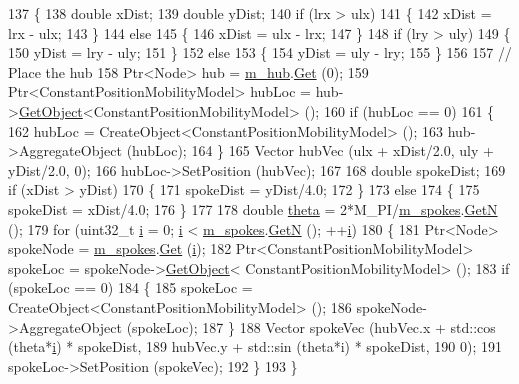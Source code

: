 \begin{DoxyCode}
137 \{
138   \textcolor{keywordtype}{double} xDist;
139   \textcolor{keywordtype}{double} yDist;
140   \textcolor{keywordflow}{if} (lrx > ulx)
141     \{
142       xDist = lrx - ulx;
143     \}
144   \textcolor{keywordflow}{else}
145     \{
146       xDist = ulx - lrx;
147     \}
148   \textcolor{keywordflow}{if} (lry > uly)
149     \{
150       yDist = lry - uly;
151     \}
152   \textcolor{keywordflow}{else}
153     \{
154       yDist = uly - lry;
155     \}
156 
157   \textcolor{comment}{// Place the hub}
158   Ptr<Node> hub = \hyperlink{classns3_1_1PointToPointStarHelper_a1bafb25c439c0dff7ec42760b22a2435}{m\_hub}.\hyperlink{classns3_1_1NodeContainer_a9ed96e2ecc22e0f5a3d4842eb9bf90bf}{Get} (0);
159   Ptr<ConstantPositionMobilityModel> hubLoc =  hub->\hyperlink{classns3_1_1Object_a13e18c00017096c8381eb651d5bd0783}{GetObject}<ConstantPositionMobilityModel> ();
160   \textcolor{keywordflow}{if} (hubLoc == 0)
161     \{
162       hubLoc = CreateObject<ConstantPositionMobilityModel> ();
163       hub->AggregateObject (hubLoc);
164     \}
165   Vector hubVec (ulx + xDist/2.0, uly + yDist/2.0, 0);
166   hubLoc->SetPosition (hubVec);
167 
168   \textcolor{keywordtype}{double} spokeDist;
169   \textcolor{keywordflow}{if} (xDist > yDist)
170     \{
171       spokeDist = yDist/4.0;
172     \}
173   \textcolor{keywordflow}{else}
174     \{
175       spokeDist = xDist/4.0;
176     \}
177 
178   \textcolor{keywordtype}{double} \hyperlink{loss__ITU1411__NLOS__over__rooftop_8m_a68ce9834ce390774bce9c89b78d5bf79}{theta} = 2*M\_PI/\hyperlink{classns3_1_1PointToPointStarHelper_a4f501e83d42c3b830f41c85621893737}{m\_spokes}.\hyperlink{classns3_1_1NodeContainer_aed647ac56d0407a7706aba02eb44b951}{GetN} ();
179   \textcolor{keywordflow}{for} (uint32\_t \hyperlink{bernuolliDistribution_8m_a6f6ccfcf58b31cb6412107d9d5281426}{i} = 0; \hyperlink{bernuolliDistribution_8m_a6f6ccfcf58b31cb6412107d9d5281426}{i} < \hyperlink{classns3_1_1PointToPointStarHelper_a4f501e83d42c3b830f41c85621893737}{m\_spokes}.\hyperlink{classns3_1_1NodeContainer_aed647ac56d0407a7706aba02eb44b951}{GetN} (); ++\hyperlink{bernuolliDistribution_8m_a6f6ccfcf58b31cb6412107d9d5281426}{i})
180     \{
181       Ptr<Node> spokeNode = \hyperlink{classns3_1_1PointToPointStarHelper_a4f501e83d42c3b830f41c85621893737}{m\_spokes}.\hyperlink{classns3_1_1NodeContainer_a9ed96e2ecc22e0f5a3d4842eb9bf90bf}{Get} (\hyperlink{bernuolliDistribution_8m_a6f6ccfcf58b31cb6412107d9d5281426}{i});
182       Ptr<ConstantPositionMobilityModel> spokeLoc = spokeNode->\hyperlink{classns3_1_1Object_a13e18c00017096c8381eb651d5bd0783}{GetObject}<
      ConstantPositionMobilityModel> ();
183       \textcolor{keywordflow}{if} (spokeLoc == 0)
184         \{
185           spokeLoc = CreateObject<ConstantPositionMobilityModel> ();
186           spokeNode->AggregateObject (spokeLoc);
187         \}
188       Vector spokeVec (hubVec.x + std::cos (theta*\hyperlink{bernuolliDistribution_8m_a6f6ccfcf58b31cb6412107d9d5281426}{i}) * spokeDist,
189                        hubVec.y + std::sin (theta*i) * spokeDist,
190                        0);
191       spokeLoc->SetPosition (spokeVec);
192     \}
193 \}
\end{DoxyCode}


